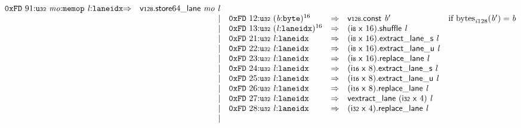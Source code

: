 $$\begin{array}{@{}l@{}rrlll@{}l@{}}
\mathtt{0xFD}~91{:}{\mathtt{u{\scriptstyle32}}}~{\mathit{mo}}{:}{\mathtt{memop}}~{\mathit{l}}{:}{\mathtt{laneidx}} &\Rightarrow& {{{\mathsf{v{\scriptstyle128}.store}}{64}}{\mathsf{\_}}}{\mathsf{lane}}~{\mathit{mo}}~{\mathit{l}} \\ &&|&
\mathtt{0xFD}~12{:}{\mathtt{u{\scriptstyle32}}}~{({\mathit{b}}{:}{\mathtt{byte}})^{16}} &\Rightarrow& \mathsf{v{\scriptstyle128}}.\mathsf{const}~{\mathit{b}'} &\quad
  \mbox{if}~{{\mathrm{bytes}}}_{{{\mathit{i}}}{128}}({\mathit{b}'}) = {\mathit{b}} \\ &&|&
\mathtt{0xFD}~13{:}{\mathtt{u{\scriptstyle32}}}~{({\mathit{l}}{:}{\mathtt{laneidx}})^{16}} &\Rightarrow& (\mathsf{i{\scriptstyle8}}~\mathsf{x}~16).\mathsf{shuffle}~{\mathit{l}} \\ &&|&
\mathtt{0xFD}~21{:}{\mathtt{u{\scriptstyle32}}}~{\mathit{l}}{:}{\mathtt{laneidx}} &\Rightarrow& {(\mathsf{i{\scriptstyle8}}~\mathsf{x}~16).\mathsf{extract\_lane\_}}{\mathsf{s}}~{\mathit{l}} \\ &&|&
\mathtt{0xFD}~22{:}{\mathtt{u{\scriptstyle32}}}~{\mathit{l}}{:}{\mathtt{laneidx}} &\Rightarrow& {(\mathsf{i{\scriptstyle8}}~\mathsf{x}~16).\mathsf{extract\_lane\_}}{\mathsf{u}}~{\mathit{l}} \\ &&|&
\mathtt{0xFD}~23{:}{\mathtt{u{\scriptstyle32}}}~{\mathit{l}}{:}{\mathtt{laneidx}} &\Rightarrow& (\mathsf{i{\scriptstyle8}}~\mathsf{x}~16).\mathsf{replace\_lane}~{\mathit{l}} \\ &&|&
\mathtt{0xFD}~24{:}{\mathtt{u{\scriptstyle32}}}~{\mathit{l}}{:}{\mathtt{laneidx}} &\Rightarrow& {(\mathsf{i{\scriptstyle16}}~\mathsf{x}~8).\mathsf{extract\_lane\_}}{\mathsf{s}}~{\mathit{l}} \\ &&|&
\mathtt{0xFD}~25{:}{\mathtt{u{\scriptstyle32}}}~{\mathit{l}}{:}{\mathtt{laneidx}} &\Rightarrow& {(\mathsf{i{\scriptstyle16}}~\mathsf{x}~8).\mathsf{extract\_lane\_}}{\mathsf{u}}~{\mathit{l}} \\ &&|&
\mathtt{0xFD}~26{:}{\mathtt{u{\scriptstyle32}}}~{\mathit{l}}{:}{\mathtt{laneidx}} &\Rightarrow& (\mathsf{i{\scriptstyle16}}~\mathsf{x}~8).\mathsf{replace\_lane}~{\mathit{l}} \\ &&|&
\mathtt{0xFD}~27{:}{\mathtt{u{\scriptstyle32}}}~{\mathit{l}}{:}{\mathtt{laneidx}} &\Rightarrow& \mathsf{vextract\_lane}~(\mathsf{i{\scriptstyle32}}~\mathsf{x}~4)~{\mathit{l}} \\ &&|&
\mathtt{0xFD}~28{:}{\mathtt{u{\scriptstyle32}}}~{\mathit{l}}{:}{\mathtt{laneidx}} &\Rightarrow& (\mathsf{i{\scriptstyle32}}~\mathsf{x}~4).\mathsf{replace\_lane}~{\mathit{l}} \\ &&|&

\end{array}$$
